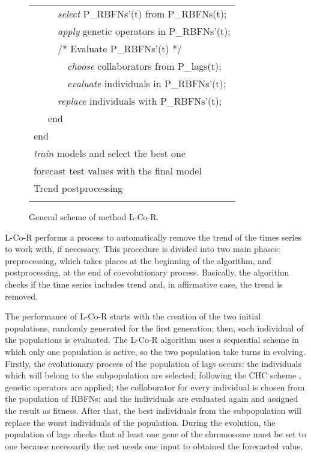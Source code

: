 \documentclass[a4paper,twoside]{article}
\newcommand{\metodo}{L-Co-R}
\begin{document}
\begin{figure}
\begin{tabular}{|l|}
\ \ \ \ \ \emph{select} P\_RBFNs'(t) from P\_RBFNs(t); \\
\ \ \ \ \ \emph{apply} genetic operators in P\_RBFNs'(t); \\
\ \ \ \ \ /* Evaluate P\_RBFNs'(t) */  \\
\ \ \ \ \ \ \ \emph{choose} collaborators from P\_lags(t); \\
\ \ \ \ \ \ \ \emph{evaluate} individuals in P\_RBFNs'(t); \\
\ \ \ \ \ \emph{replace} individuals with P\_RBFNs'(t);  \\
\ \ \ end  \\
end  \\
\emph{train} models and select the best one \\
forecast test values with the final model \\
Trend postprocessing \\
\\
\hline
\end{tabular}
\caption{General scheme of method {\metodo}.}
\label{generalscheme}
\end{figure}

{\metodo} performs a process to automatically remove the trend of the times series to work with, if necessary. This procedure is divided into two main phases: preprocessing, which takes places at the beginning of the algorithm, and postprocessing, at the end of coevolutionary process. Basically, the algorithm checks if the time series includes trend and, in affirmative case, the trend is removed.

The performance of {\metodo} starts with the creation of the two initial populations, randomly generated for the first generation; then, each individual of the populations is evaluated. The {\metodo} algorithm uses a sequential scheme in which only one population is active, so the two population take turns in evolving. Firstly, the evolutionary process of the population of lags occurs: the individuals which will belong to the subpopulation are selected; following the CHC scheme \cite{Eshelman}, genetic operators are applied; the collaborator for every individual is chosen from the population of RBFNs; and the individuals are evaluated again and assigned the result as fitness. After that, the best individuals from the subpopulation will replace the worst individuals of the population. During the evolution, the population of lags checks that al least one gene of the chromosome must be set to one because necessarily the net needs one input to obtained the forecasted value.
\end{document}
